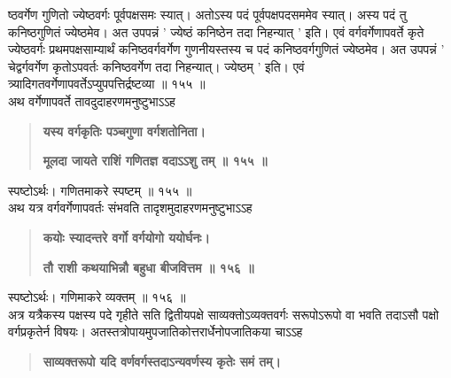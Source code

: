 \documentclass[11pt, openany]{book}
\begin{document}
\begin{sloppypar}
\hangindent=0.2in ष्ठवर्गेण गुणितो ज्येष्ठवर्गः पूर्वपक्षसमः स्यात्। अतोऽस्य पदं पूर्वपक्षपदसममेव स्यात्। अस्य पदं तु कनिष्ठगुणितं ज्येष्ठमेव। अत उपपन्नं ' ज्येष्ठं कनिष्ठेन तदा निहन्यात् ' इति। एवं वर्गवर्गेणापवर्ते कृते ज्येष्ठवर्गः प्रथमपक्षसाम्यार्थं कनिष्ठवर्गवर्गेण गुणनीयस्तस्य च पदं कनिष्ठवर्गगुणितं ज्येष्ठमेव। अत उपपन्नं ' चेद्वर्गवर्गेण कृतोऽपवर्तः कनिष्ठवर्गेण तदा निहन्यात्। ज्येष्ठम् ' इति। एवं त्र्यादिगतवर्गेणापवर्तेऽप्युपपत्तिर्द्रष्टव्या ॥ १५५ ॥\\

\hangindent=0.2in \hspace{0.2in}अथ वर्गेणापवर्ते तावदुदाहरणमनुष्टुभाऽऽह\textendash

\begin{quote}
\hspace{1in}\textbf{यस्य वर्गकृतिः पञ्चगुणा वर्गशतोनिता।}

\hspace{1in}\textbf{मूलदा जायते राशिं गणितज्ञ वदाऽऽशु तम् ॥ १५५ ॥}
\end{quote}

\hangindent=0.2in \hspace{0.2in}स्पष्टोऽर्थः। गणितमाकरे स्पष्टम् ॥ १५५ ॥\\

\hangindent=0.2in \hspace{0.2in}अथ यत्र वर्गवर्गेणापवर्तः संभवति तादृशमुदाहरणमनुष्टुभाऽऽह\textendash

\begin{quote}
\hspace{1in}\textbf{कयोः स्यादन्तरे वर्गो वर्गयोगो ययोर्घनः।}

\hspace{1in}\textbf{तौ राशी कथयाभिन्नौ बहुधा बीजवित्तम ॥ १५६ ॥}
\end{quote}

\hangindent=0.2in \hspace{0.2in}स्पष्टोऽर्थः। गणिमाकरे व्यक्तम् ॥ १५६ ॥\\

\hangindent=0.2in \hspace{0.2in}अत्र यत्रैकस्य पक्षस्य पदे गृहीते सति द्वितीयपक्षे साव्यक्तोऽव्यक्तवर्गः सरूपोऽरूपो वा भवति तदाऽसौ पक्षो वर्गप्रकृतेर्न विषयः। अतस्तत्रोपायमुपजातिकोत्तरार्धेनोपजातिकया चाऽऽह\textendash

\begin{quote}
\hspace{1in}\textbf{साव्यक्तरूपो यदि वर्णवर्गस्तदाऽन्यवर्णस्य कृतेः समं तम्।}


\end{quote}
\end{sloppypar}
\end{document}

